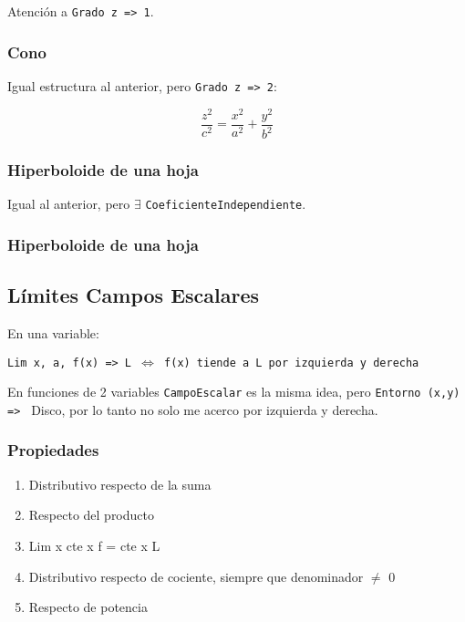 Atención a \texttt{Grado z => 1}.

\subsubsection{Cono}

Igual estructura al anterior, pero \texttt{Grado z => 2}:

\begin{equation*}
    \frac{z^{2}}{c^{2}} = \frac{x^{2}}{a^{2}} + \frac{y^{2}}{b^{2}}
\end{equation*}

\subsubsection{Hiperboloide de una hoja}

Igual al anterior, pero \(\exists\) \texttt{CoeficienteIndependiente}.

\subsubsection{Hiperboloide de una hoja}


\subsection{Límites Campos Escalares}

En una variable:

\texttt{Lim x, a, f(x) => L \(\iff\) f(x) tiende a L por izquierda y derecha}

En funciones de 2 variables \texttt{CampoEscalar} es la misma idea,
pero \texttt{Entorno (x,y) => } Disco,
por lo tanto no solo me acerco por izquierda y derecha.

\subsubsection{Propiedades}

\begin{enumerate}
    \item Distributivo respecto de la suma
    \item Respecto del producto
    \item Lim x cte x f = cte x L
    \item Distributivo respecto de cociente, siempre que denominador \(\neq\) 0
    \item Respecto de potencia
\end{enumerate}

